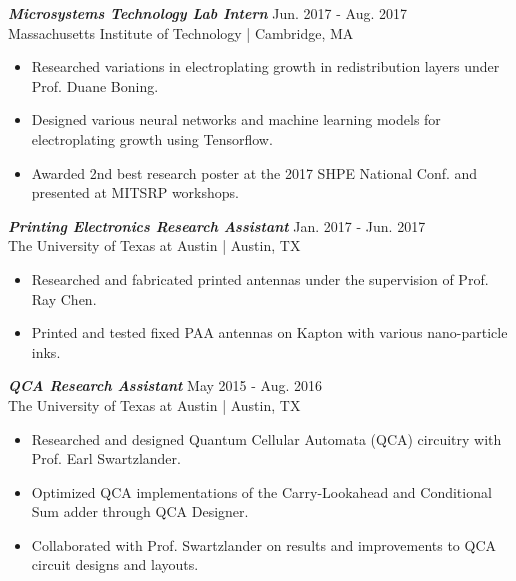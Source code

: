\documentclass[letter]{res}
\begin{document}
\begin{resume}
\vspace{-2mm}

{\sl \textbf{Microsystems Technology Lab Intern}} \hfill Jun. 2017 - Aug. 2017\\
Massachusetts Institute of Technology | Cambridge, MA \newline

 \vspace{-4mm}

 \begin{itemize}
 \item Researched variations in electroplating growth in redistribution layers under Prof. Duane Boning.
 \item Designed various neural networks and machine learning models for electroplating growth using Tensorflow.
 \item Awarded 2nd best research poster at the 2017 SHPE National Conf. and presented at MITSRP workshops.
 \end{itemize}

\vspace{-2mm}

{\sl \textbf{Printing Electronics Research Assistant}} \hfill Jan. 2017 - Jun. 2017\\
The University of Texas at Austin | Austin, TX \newline

 \vspace{-4mm}

 \begin{itemize}
 \item Researched and fabricated printed antennas under the supervision of Prof. Ray Chen.
 \item Printed and tested fixed PAA antennas on Kapton with various nano-particle inks.
 \end{itemize}

\vspace{-2mm}

{\sl \textbf{QCA Research Assistant}} \hfill May 2015 - Aug. 2016\\
The University of Texas at Austin | Austin, TX \newline

 \vspace{-4mm}

 \begin{itemize}
 \item Researched and designed Quantum Cellular Automata (QCA) circuitry with Prof. Earl Swartzlander.
 \item Optimized QCA implementations of the Carry-Lookahead and Conditional Sum adder through QCA Designer.
 \item Collaborated with Prof. Swartzlander on results and improvements to QCA circuit designs and layouts.
 \end{itemize}


\end{resume}
\end{document}
